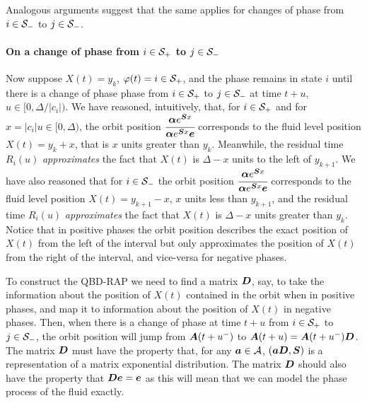 Analogous arguments suggest that the same applies for changes of phase from \(i\in\mathcal{S}_-\) to \(j\in\mathcal{S}_-\). 

\paragraph{On a change of phase from \(i\in\mathcal{S}_+\) to \(j\in\mathcal{S}_-\)} Now suppose \(X(t)=y_k\), \(\varphi(t)=i\in\mathcal{S}_+\), and the phase remains in state \(i\) until there is a change of phase phase from \(i\in\mathcal{S}_+\) to \(j\in\mathcal{S}_-\) at time \(t+u\), \(u\in[0,\Delta/|c_i|)\). We have reasoned, intuitively, that, for \(i\in\mathcal{S}_+\) and for \(x=|c_i|u\in[0,\Delta)\), the orbit position \(\cfrac{\boldsymbol\alpha e^{\boldsymbol Sx} }{\boldsymbol\alpha e^{\boldsymbol Sx } \boldsymbol e}\) corresponds to the fluid level position \(X(t) = y_k+x\), that is \(x\) units greater than \(y_k\). Meanwhile, the residual time \(R_i(u)\) \emph{approximates} the fact that \(X(t)\) is \(\Delta-x\) units to the left of \(y_{k+1}\). We have also reasoned that for \(i\in\mathcal{S}_-\) the orbit position \(\cfrac{\boldsymbol\alpha e^{\boldsymbol Sx} }{\boldsymbol\alpha e^{\boldsymbol Sx } \boldsymbol e}\) corresponds to the fluid level position \(X(t) = y_{k+1}-x\), \(x\) units less than \(y_{k+1}\), and the residual time \(R_i(u)\) \emph{approximates} the fact that \(X(t)\) is \(\Delta-x\) units greater than \(y_k\). Notice that in positive phases the orbit position describes the exact position of \(X(t)\) from the left of the interval but only approximates the position of \(X(t)\) from the right of the interval, and vice-versa for negative phases. 

To construct the QBD-RAP we need to find a matrix \(\boldsymbol D\), say, to take the information about the position of \(X(t)\) contained in the orbit when in positive phases, and map it to information about the position of \(X(t)\) in negative phases. Then, when there is a change of phase at time \(t+u\) from \(i\in\mathcal{S}_+\) to \(j\in\mathcal{S}_-\), the orbit position will jump from \(\boldsymbol A(t+u^-)\) to \(\boldsymbol A(t+u)=\boldsymbol A(t+u^-)\boldsymbol D\). The matrix \(\boldsymbol D\) must have the property that, for any \(\boldsymbol a\in\mathcal A\), \((\boldsymbol a\boldsymbol D, \boldsymbol S)\) is a representation of a matrix exponential distribution. The matrix \(\boldsymbol D\) should also have the property that \(\boldsymbol D \boldsymbol e = \boldsymbol e\) as this will mean that we can model the phase process of the fluid exactly. 

